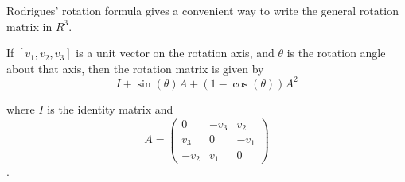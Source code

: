 \documentclass[12pt]{article}
\begin{document}
Rodrigues' rotation formula gives a convenient way to write the general rotation matrix in $R^3$.

If $[v_1, v_2, v_3]$ is a unit vector on the rotation axis, and $\theta$ is the rotation angle about that axis, then the rotation matrix is given by 
$$ I + \sin(\theta) A +(1-\cos(\theta))A^2 $$

where $I$ is the identity matrix and 
$$ A =
\begin{pmatrix}
0 & -v_3 & v_2 \\
v_3 & 0 & -v_1 \\
-v_2 & v_1 & 0
\end{pmatrix}
$$.
\end{document}
